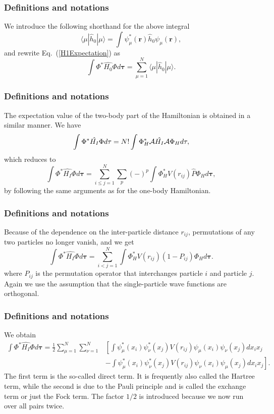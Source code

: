 \documentclass[compress]{beamer}
\begin{document}
\frame
{
  \frametitle{Definitions and notations}
\begin{small}
{\scriptsize
We introduce the following shorthand for the above integral
\[
\langle \mu | \hat{h}_0 | \mu \rangle = \int \psi_{\mu}^*(\mathbf{r})\hat{h}_0\psi_{\mu}(\mathbf{r}),
\]
and rewrite Eq.~(\ref{H1Expectation}) as
\begin{equation}
  \int \Phi^*\hat{H_0}\Phi  d\mathbf{\tau}
  = \sum_{\mu=1}^N \langle \mu | \hat{h}_0 | \mu \rangle.
  \label{H1Expectation1}
\end{equation}

}
\end{small}
}
\frame
{
  \frametitle{Definitions and notations}
\begin{small}
{\scriptsize
The expectation value of the two-body part of the Hamiltonian is obtained in a
similar manner. We have
\begin{equation*}
  \int \Phi^*\hat{H_I}\Phi d\mathbf{\tau} 
  = N! \int \Phi_H^*{\cal A}\hat{H_I}{\cal A}\Phi_H d\mathbf{\tau},
\end{equation*}
which reduces to
\begin{equation*}
 \int \Phi^*\hat{H_I}\Phi d\mathbf{\tau} 
  = \sum_{i\le j=1}^N \sum_{p} (-)^p\int 
  \Phi_H^*V(r_{ij})\hat{P}\Phi_H d\mathbf{\tau},
\end{equation*}
by following the same arguments as for the one-body
Hamiltonian. 
}
\end{small}
}
\frame
{
  \frametitle{Definitions and notations}
\begin{small}
{\scriptsize
Because of the dependence on the inter-particle distance $r_{ij}$,  permutations of
any two particles no longer vanish, and we get
\begin{equation*}
  \int \Phi^*\hat{H_I}\Phi d\mathbf{\tau} 
  = \sum_{i < j=1}^N \int  
  \Phi_H^*V(r_{ij})(1-P_{ij})\Phi_H d\mathbf{\tau}.
\end{equation*}
where $P_{ij}$ is the permutation operator that interchanges
particle $i$ and particle $j$. Again we use the assumption that the single-particle wave functions
are orthogonal. 
}
\end{small}
}
\frame
{
  \frametitle{Definitions and notations}
\begin{small}
{\scriptsize
We obtain
\begin{equation}
\begin{split}
  \int \Phi^*\hat{H_I}\Phi d\mathbf{\tau} 
  = \frac{1}{2}\sum_{\mu=1}^N\sum_{\nu=1}^N
    &\left[ \int \psi_{\mu}^*(x_i)\psi_{\nu}^*(x_j)V(r_{ij})\psi_{\mu}(x_i)\psi_{\nu}(x_j)
    dx_ix_j \right.\\
  &\left.
  - \int \psi_{\mu}^*(x_i)\psi_{\nu}^*(x_j)
  V(r_{ij})\psi_{\nu}(x_i)\psi_{\mu}(x_j)
  dx_ix_j
  \right]. \label{H2Expectation}
\end{split}
\end{equation}
The first term is the so-called direct term. It is frequently also called the  Hartree term, 
while the second is due to the Pauli principle and is called
the exchange term or just the Fock term.
The factor  $1/2$ is introduced because we now run over
all pairs twice. 
}
\end{small}
}
\end{document}
